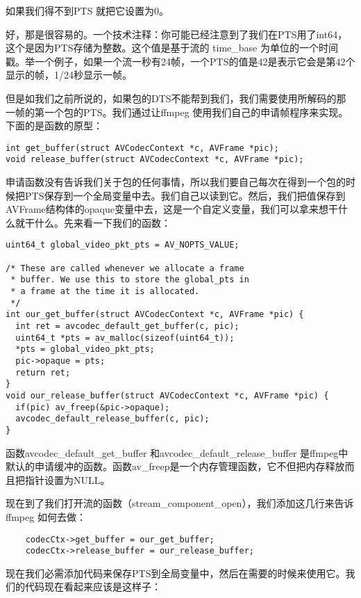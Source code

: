如果我们得不到PTS 就把它设置为0。

好，那是很容易的。一个技术注释：你可能已经注意到了我们在PTS用了int64，这个是因为PTS存储为整数。这个值是基于流的 time_base 为单位的一个时间戳。举一个例子，如果一个流一秒有24帧，一个PTS的值是42是表示它会是第42个显示的帧，1/24秒显示一帧。

但是如我们之前所说的，如果包的DTS不能帮到我们，我们需要使用所解码的那一帧的第一个包的PTS。我们通过让ffmpeg 使用我们自己的申请帧程序来实现。下面的是函数的原型：


\begin{lstlisting}
int get_buffer(struct AVCodecContext *c, AVFrame *pic);
void release_buffer(struct AVCodecContext *c, AVFrame *pic);
\end{lstlisting}

申请函数没有告诉我们关于包的任何事情，所以我们要自己每次在得到一个包的时候把PTS保存到一个全局变量中去。我们自己以读到它。然后，我们把值保存到AVFrame结构体的opaque变量中去，这是一个自定义变量，我们可以拿来想干什么就干什么。先来看一下我们的函数：
\begin{lstlisting}
uint64_t global_video_pkt_pts = AV_NOPTS_VALUE;

/* These are called whenever we allocate a frame
 * buffer. We use this to store the global_pts in
 * a frame at the time it is allocated.
 */
int our_get_buffer(struct AVCodecContext *c, AVFrame *pic) {
  int ret = avcodec_default_get_buffer(c, pic);
  uint64_t *pts = av_malloc(sizeof(uint64_t));
  *pts = global_video_pkt_pts;
  pic->opaque = pts;
  return ret;
}
void our_release_buffer(struct AVCodecContext *c, AVFrame *pic) {
  if(pic) av_freep(&pic->opaque);
  avcodec_default_release_buffer(c, pic);
}
\end{lstlisting}

函数avcodec_default_get_buffer 和avcodec_default_release_buffer 是ffmpeg中默认的申请缓冲的函数。函数av_freep是一个内存管理函数，它不但把内存释放而且把指针设置为NULL。

现在到了我们打开流的函数（stream_component_open），我们添加这几行来告诉ffmpeg 如何去做：

\begin{lstlisting}
    codecCtx->get_buffer = our_get_buffer;
    codecCtx->release_buffer = our_release_buffer;
\end{lstlisting}

现在我们必需添加代码来保存PTS到全局变量中，然后在需要的时候来使用它。我们的代码现在看起来应该是这样子：

